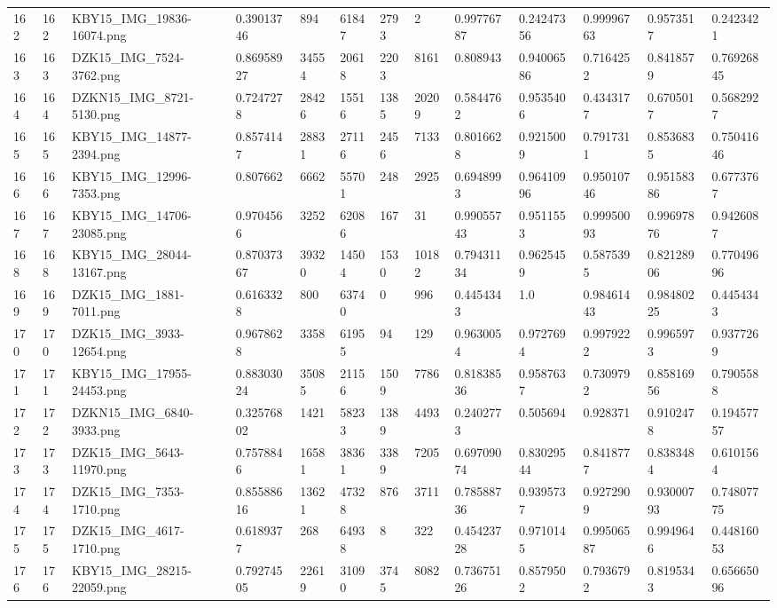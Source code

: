 \documentclass[11pt, a4paper, twoside]{report}
\begin{document}
\begin{longtable}[c]{@{}lllllllllllll@{}}
162 & 162 & KBY15\_IMG\_19836-16074.png & 0.39013746 & 894 & 61847 & 2793 & 2 & 0.99776787 & 0.24247356 & 0.99996763 & 0.9573517 & 0.2423421 \\
163 & 163 & DZK15\_IMG\_7524-3762.png & 0.86958927 & 34554 & 20618 & 2203 & 8161 & 0.808943 & 0.94006586 & 0.7164252 & 0.8418579 & 0.76926845 \\
164 & 164 & DZKN15\_IMG\_8721-5130.png & 0.7247278 & 28426 & 15516 & 1385 & 20209 & 0.5844762 & 0.9535406 & 0.4343177 & 0.6705017 & 0.5682927 \\
165 & 165 & KBY15\_IMG\_14877-2394.png & 0.8574147 & 28831 & 27116 & 2456 & 7133 & 0.8016628 & 0.9215009 & 0.7917311 & 0.8536835 & 0.75041646 \\
166 & 166 & KBY15\_IMG\_12996-7353.png & 0.807662 & 6662 & 55701 & 248 & 2925 & 0.6948993 & 0.96410996 & 0.95010746 & 0.95158386 & 0.6773767 \\
167 & 167 & KBY15\_IMG\_14706-23085.png & 0.9704566 & 3252 & 62086 & 167 & 31 & 0.99055743 & 0.9511553 & 0.99950093 & 0.99697876 & 0.9426087 \\
168 & 168 & KBY15\_IMG\_28044-13167.png & 0.87037367 & 39320 & 14504 & 1530 & 10182 & 0.79431134 & 0.9625459 & 0.5875395 & 0.82128906 & 0.77049696 \\
169 & 169 & DZK15\_IMG\_1881-7011.png & 0.6163328 & 800 & 63740 & 0 & 996 & 0.4454343 & 1.0 & 0.98461443 & 0.98480225 & 0.4454343 \\
170 & 170 & DZK15\_IMG\_3933-12654.png & 0.9678628 & 3358 & 61955 & 94 & 129 & 0.9630054 & 0.9727694 & 0.9979222 & 0.9965973 & 0.9377269 \\
171 & 171 & KBY15\_IMG\_17955-24453.png & 0.88303024 & 35085 & 21156 & 1509 & 7786 & 0.81838536 & 0.9587637 & 0.7309792 & 0.85816956 & 0.7905588 \\
172 & 172 & DZKN15\_IMG\_6840-3933.png & 0.32576802 & 1421 & 58233 & 1389 & 4493 & 0.2402773 & 0.505694 & 0.928371 & 0.9102478 & 0.19457757 \\
173 & 173 & DZK15\_IMG\_5643-11970.png & 0.7578846 & 16581 & 38361 & 3389 & 7205 & 0.69709074 & 0.83029544 & 0.8418777 & 0.8383484 & 0.6101564 \\
174 & 174 & DZK15\_IMG\_7353-1710.png & 0.85588616 & 13621 & 47328 & 876 & 3711 & 0.78588736 & 0.9395737 & 0.9272909 & 0.93000793 & 0.74807775 \\
175 & 175 & DZK15\_IMG\_4617-1710.png & 0.6189377 & 268 & 64938 & 8 & 322 & 0.45423728 & 0.9710145 & 0.99506587 & 0.9949646 & 0.44816053 \\
176 & 176 & KBY15\_IMG\_28215-22059.png & 0.79274505 & 22619 & 31090 & 3745 & 8082 & 0.73675126 & 0.8579502 & 0.7936792 & 0.8195343 & 0.65665096 \\

\end{longtable}
\end{document}

